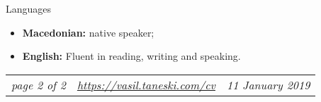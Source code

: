 \documentclass[]{mcdowellcv}
\begin{document}
    \begin{cvsection}{Languages}
    \label{Languages}
        \begin{cvsubsection}{}{}{}
            \begin{itemize}
                \item \textbf{Macedonian:} native speaker;
                \item \textbf{English:} Fluent in reading, writing and speaking.
            \end{itemize}
        \end{cvsubsection}
    \end{cvsection}
    \vfill
    \begin{tabu} to 1\textwidth {X[l,m] X[c,m] X[r,m]}
        \textit{page 2 of 2} &
        \textit{\url{https://vasil.taneski.com/cv}} &
        \textit{11 January 2019}
    \end{tabu}
    \clearpage
\end{document}
